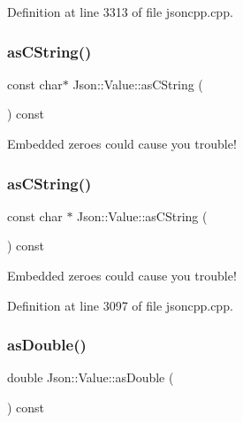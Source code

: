 Definition at line 3313 of file jsoncpp.\+cpp.

\hypertarget{class_json_1_1_value_a3cd4875a041f3fe12c9b6a5af768d669}{}\label{class_json_1_1_value_a3cd4875a041f3fe12c9b6a5af768d669} 
\subsubsection{\texorpdfstring{as\+C\+String()}{asCString()}\hspace{0.1cm}{\footnotesize\ttfamily [1/2]}}
{\footnotesize\ttfamily const char$\ast$ Json\+::\+Value\+::as\+C\+String (\begin{DoxyParamCaption}{ }\end{DoxyParamCaption}) const}



Embedded zeroes could cause you trouble! 

\hypertarget{class_json_1_1_value_a16668c8db7ef0a5de040012f0dfd84b0}{}\label{class_json_1_1_value_a16668c8db7ef0a5de040012f0dfd84b0} 
\subsubsection{\texorpdfstring{as\+C\+String()}{asCString()}\hspace{0.1cm}{\footnotesize\ttfamily [2/2]}}
{\footnotesize\ttfamily const char $\ast$ Json\+::\+Value\+::as\+C\+String (\begin{DoxyParamCaption}{ }\end{DoxyParamCaption}) const}



Embedded zeroes could cause you trouble! 



Definition at line 3097 of file jsoncpp.\+cpp.

\hypertarget{class_json_1_1_value_afd24002a18aef907ad746b1cb9eda0a2}{}\label{class_json_1_1_value_afd24002a18aef907ad746b1cb9eda0a2} 
\subsubsection{\texorpdfstring{as\+Double()}{asDouble()}\hspace{0.1cm}{\footnotesize\ttfamily [1/2]}}
{\footnotesize\ttfamily double Json\+::\+Value\+::as\+Double (\begin{DoxyParamCaption}{ }\end{DoxyParamCaption}) const}

